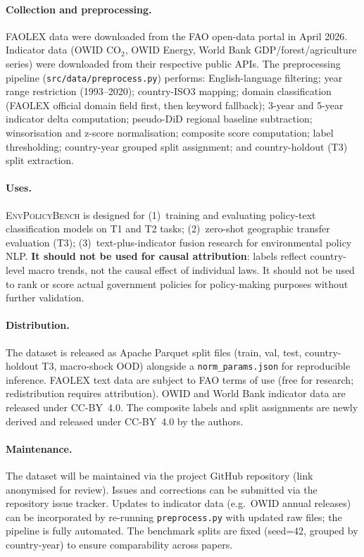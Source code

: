 \documentclass[11pt]{article}
\newcommand{\bench}{\textsc{EnvPolicyBench}}
\begin{document}
\paragraph{Collection and preprocessing.}
FAOLEX data were downloaded from the FAO open-data portal in April 2026.
Indicator data (OWID CO$_2$, OWID Energy, World Bank GDP/forest/agriculture
series) were downloaded from their respective public APIs.
The preprocessing pipeline (\texttt{src/data/preprocess.py}) performs:
English-language filtering; year range restriction (1993--2020); country-ISO3
mapping; domain classification (FAOLEX official domain field first, then keyword
fallback); 3-year and 5-year indicator delta computation; pseudo-DiD regional
baseline subtraction; winsorisation and z-score normalisation; composite score
computation; label thresholding; country-year grouped split assignment; and
country-holdout (T3) split extraction.

\paragraph{Uses.}
\bench{} is designed for (1)~training and evaluating policy-text classification
models on T1 and T2 tasks; (2)~zero-shot geographic transfer evaluation (T3);
(3)~text-plus-indicator fusion research for environmental policy NLP.
\textbf{It should not be used for causal attribution}: labels reflect
country-level macro trends, not the causal effect of individual laws.
It should not be used to rank or score actual government policies for
policy-making purposes without further validation.

\paragraph{Distribution.}
The dataset is released as Apache Parquet split files (train, val, test,
country-holdout T3, macro-shock OOD) alongside a \texttt{norm\_params.json}
for reproducible inference. FAOLEX text data are subject to FAO terms of use
(free for research; redistribution requires attribution).
OWID and World Bank indicator data are released under CC-BY~4.0.
The composite labels and split assignments are newly derived and released
under CC-BY~4.0 by the authors.

\paragraph{Maintenance.}
The dataset will be maintained via the project GitHub repository (link
anonymised for review). Issues and corrections can be submitted via the
repository issue tracker. Updates to indicator data (e.g.\ OWID annual
releases) can be incorporated by re-running \texttt{preprocess.py} with
updated raw files; the pipeline is fully automated. The benchmark splits
are fixed (seed=42, grouped by country-year) to ensure comparability
across papers.
\end{document}

